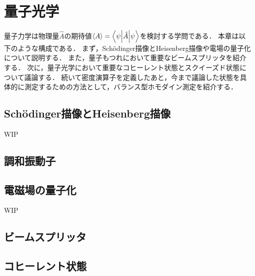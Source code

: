 \documentclass{report}
\begin{document}
  \maketitle
  \tableofcontents
  \chapter{量子光学}
    量子力学は物理量$\hat{A}$の期待値$\ev{A} = \mel**{\psi}{\hat{A}}{\psi}$を検討する学問である．
    本章は以下のような構成である．
    まず，Sch\"odinger描像とHeisenberg描像や電場の量子化について説明する．
    また，量子もつれにおいて重要なビームスプリッタを紹介する．
    次に，量子光学において重要なコヒーレント状態とスクイーズド状態について議論する．
    続いて密度演算子を定義したあと，今まで議論した状態を具体的に測定するための方法として，バランス型ホモダイン測定を紹介する．
    \section{Sch\"odinger描像とHeisenberg描像}
      WIP
    \section{調和振動子}
      
    \section{電磁場の量子化}
      WIP
    \section{ビームスプリッタ}
      
    \section{コヒーレント状態}
      
\end{document}
